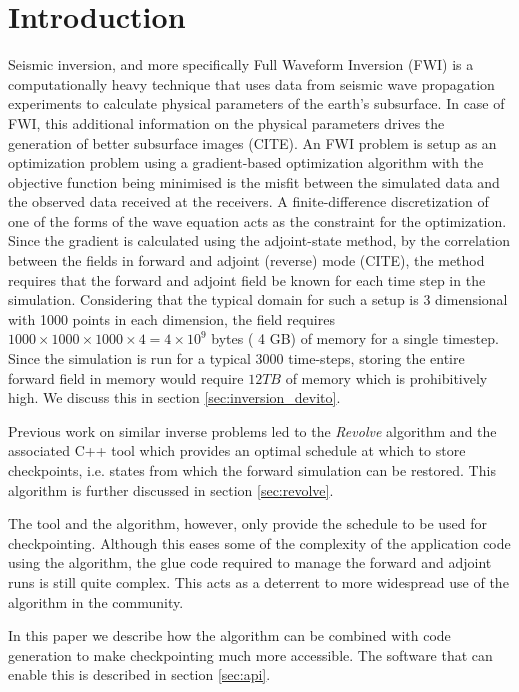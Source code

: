 \documentclass[sigconf]{acmart}
\begin{document}
\maketitle

\section{Introduction}
Seismic inversion, and more specifically Full Waveform Inversion (FWI)
is a computationally heavy technique that uses data from seismic wave
propagation experiments to calculate physical parameters of the
earth's subsurface. In case of FWI, this additional information on the
physical parameters drives the generation of better subsurface
images (CITE). An FWI problem is setup as an optimization problem using
a gradient-based optimization algorithm with the objective function
being minimised is the misfit between the simulated data and the
observed data received at the receivers. A finite-difference
discretization of one of the forms of the wave equation acts as the
constraint for the optimization. Since the gradient is calculated using the
adjoint-state method, by the correlation between the fields in forward
and adjoint (reverse) mode (CITE), the method requires that the forward and
adjoint field be known for each time step in the
simulation. Considering that the typical domain for such a setup is 3
dimensional with 1000 points in each dimension, the field requires
$1000 \times 1000 \times 1000 \times 4 = 4 \times 10^{9} $ bytes ( 4
GB) of memory for a single timestep. Since the simulation is run for a
typical $3000$ time-steps, storing the entire forward field in memory
would require $12 TB$ of memory which is prohibitively high. We
discuss this in section \ref{sec:inversion_devito}. 

Previous work on similar inverse problems led to the \emph{Revolve}
algorithm \cite{griewank2000} and the associated C++ tool which
provides an optimal schedule at which to store checkpoints,
i.e. states from which the forward simulation can be restored. This
algorithm is further discussed in section \ref{sec:revolve}.

The tool and the algorithm, however, only provide the schedule to be
used for checkpointing. Although this eases some of the complexity of
the application code using the algorithm, the glue code required to
manage the forward and adjoint runs is still quite complex. This acts
as a deterrent to more widespread use of the algorithm in the
community. 

In this paper we describe how the algorithm can be combined with code
generation to make checkpointing much more accessible. The software that
can enable this is described in section \ref{sec:api}. 
\end{document}
